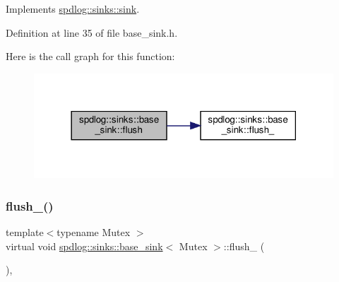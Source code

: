 Implements \hyperlink{classspdlog_1_1sinks_1_1sink_a8a0674ae3bca8f1617aef820e23a2ccd}{spdlog\+::sinks\+::sink}.



Definition at line 35 of file base\+\_\+sink.\+h.

Here is the call graph for this function\+:
\nopagebreak
\begin{figure}[H]
\begin{center}
\leavevmode
\includegraphics[width=318pt]{classspdlog_1_1sinks_1_1base__sink_a2de93f1edc37e891555685ed4e520343_cgraph}
\end{center}
\end{figure}
\mbox{\label{classspdlog_1_1sinks_1_1base__sink_a5ac2b237c60f68a18122a1ca09b812b4}} 
\subsubsection{\texorpdfstring{flush\+\_\+()}{flush\_()}}
{\footnotesize\ttfamily template$<$typename Mutex $>$ \\
virtual void \hyperlink{classspdlog_1_1sinks_1_1base__sink}{spdlog\+::sinks\+::base\+\_\+sink}$<$ Mutex $>$\+::flush\+\_\+ (\begin{DoxyParamCaption}{ }\end{DoxyParamCaption})\hspace{0.3cm}{\ttfamily [protected]}, {}}



